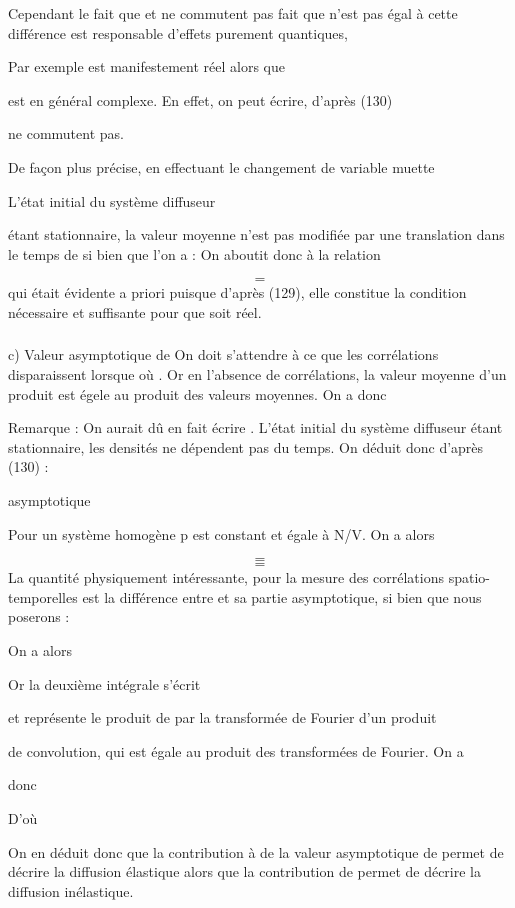 Cependant le fait que  et  ne commutent pas fait que
 n'est pas égal à cette différence est responsable d'effets
purement quantiques,

Par exemple  est manifestement réel alors que 

est en général complexe. En effet, on peut écrire, d'après (130)

 ne commutent pas.

De façon plus précise, en effectuant le changement de variable muette


L'état initial du système diffuseur

étant stationnaire, la valeur moyenne  n'est pas modifiée par une
translation dans le temps de  si bien que l'on a :
On aboutit donc à la relation

\[
\tag{142}=
\]
qui était évidente a priori puisque d'après (129), elle constitue la condition
nécessaire et suffisante pour que  soit réel.
\subsubsection{}%
c) Valeur asymptotique de 
On doit s'attendre à ce que les corrélations disparaissent
lorsque  où . Or en l'absence de corrélations, la valeur
moyenne d'un produit est égele au produit des valeurs moyennes. On a donc

Remarque : On aurait dû en fait écrire . L'état initial du
système diffuseur étant stationnaire, les densités ne dépendent pas du temps.
On déduit donc d'après (130) :

asymptotique

Pour un système homogène p est constant et égale à N/V.
On a alors

\[
\tag{144}=
\]
\[
\tag{145}=
\]
La quantité physiquement intéressante, pour la mesure des corrélations
spatio-temporelles est la différence entre  et sa partie asymptotique, si bien que nous poserons :

On a alors

Or la deuxième intégrale s'écrit

et représente le produit de  par la transformée de Fourier d'un produit

de convolution, qui est égale au produit des transformées de Fourier. On a

donc

D'où

On en déduit donc que la contribution à  de la valeur asymptotique de
 permet de décrire la diffusion élastique alors que la contribution de
 permet de décrire la diffusion inélastique.
